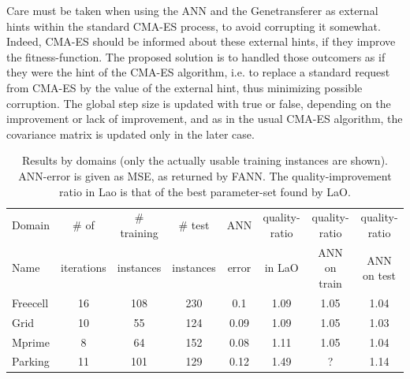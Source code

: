 \documentclass[runningheads,a4paper]{llncs}
\begin{document}
Care must be taken when using the ANN and the Genetransferer as external hints within the standard CMA-ES process, to avoid corrupting it somewhat. Indeed, CMA-ES should be informed about these external hints, if they improve the fitness-function. The proposed solution is to handled those outcomers as if they were the hint of the CMA-ES algorithm, i.e. to replace a standard request from CMA-ES by the value of the external hint, thus minimizing possible corruption. The global step size is updated with true or false, depending on the improvement or lack of improvement, and as in the usual CMA-ES algorithm, the covariance matrix is updated only in the later case.

\begin{table}[ht]
\centering
\begin{tabular}{l c c c c c c c}
\hline\hline
Domain & \# of & \# training & \# test &  ANN & quality-ratio & quality-ratio & quality-ratio \\ 
Name & iterations  & instances &  instances &  error & in LaO & ANN on train & ANN on test \\ 
\hline
Freecell& 16 & 108 & 230 & 0.1 & 1.09 & 1.05 & 1.04  \\
Grid & 10 & 55 & 124 & 0.09 & 1.09 & 1.05 & 1.03  \\
Mprime & 8 & 64 & 152 & 0.08 & 1.11 & 1.05 & 1.04   \\
Parking & 11 & 101 & 129 & 0.12 &  1.49 & ?  & 1.14   \\
\hline
\end{tabular}
\caption{Results by domains (only the actually usable training instances are shown). ANN-error is given as MSE, as returned by FANN. The quality-improvement ratio in Lao is that of the best parameter-set found by LaO.}
\label{table:domains}
\end{table} 
\end{document}
